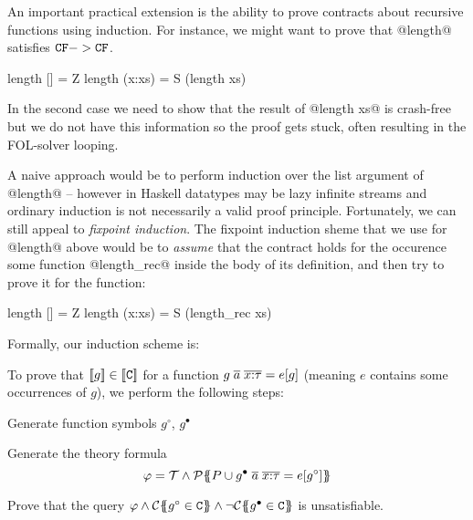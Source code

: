 \label{sect:induction}

An important practical extension is the ability to prove contracts about recursive functions
using induction. For instance, we might want to prove that @length@ satisfies ${\tt CF} -> {\tt CF}$.
\begin{code}
  length []     = Z 
  length (x:xs) = S (length xs)
\end{code}
In the second case we need to show that the result of @length xs@ is crash-free but we do not 
have this information so the proof gets stuck, often resulting in the FOL-solver looping. 

A naive approach would be to perform induction over the list argument of @length@ -- however
in Haskell datatypes may be lazy infinite streams and ordinary induction is not necessarily 
a valid proof principle. Fortunately, we can still appeal to {\em fixpoint induction}. The 
fixpoint induction sheme that we use for @length@ above would be to {\em assume} that the 
contract holds for the occurence some function @length_rec@ inside the body of its definition, 
and then try to prove it for the function:
\begin{code}
  length []     = Z 
  length (x:xs) = S (length_rec xs)
\end{code}

Formally, our induction scheme is:
\begin{definition}\label{def:induction}
To prove that $[\![g]\!] \in [\![{\tt C}]\!]$ for a function 
$g\;\overline{a}\;\overline{x{:}\tau} = e[g]$ (meaning $e$ contains
some occurrences of $g$), we perform the following steps:
\begin{itemize*}
  \item Generate function symbols $g^{\circ}$, $g^{\bullet}$
  \item Generate the theory formula \[ \varphi = {\cal T} \land 
             {\cal P}\{\!\!\{P \cup g^{\bullet}\;\overline{a}\;\overline{x{:}\tau} = e[g^{\circ}]\}\!\!\} \] 
  \item Prove that the query $\phi \land \ctrans{}{}{g^{\circ} \in \Ct} \land \neg \ctrans{}{}{g^{\bullet} \in \Ct}$
        is unsatisfiable.
\end{itemize*}
\end{definition}

